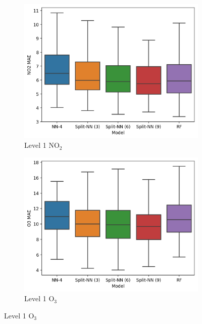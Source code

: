 \documentclass[journal abbreviation, manuscript]{copernicus}
\newcommand{\textus}[1]{$_{\text{#1}}$}
\begin{document}

\begin{figure}[H]
\centering
\begin{subfigure}{0.45\textwidth}
\includegraphics[width=\textwidth]{results/split-no2-location-mae}
\caption{Level 1 NO\textus{2}}
\end{subfigure}
\begin{subfigure}{0.45\textwidth}
\includegraphics[width=\textwidth]{results/split-o3-location-mae}
\caption{Level 1 O\textus{3}}
\end{subfigure}

\end{figure}
\end{document}
